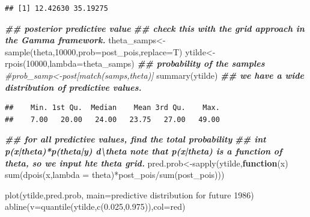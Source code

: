 \documentclass[
]{book}
\newenvironment{Shaded}{\begin{snugshade}}{\end{snugshade}}
\newcommand{\AttributeTok}[1]{\textcolor[rgb]{0.77,0.63,0.00}{#1}}
\newcommand{\CommentTok}[1]{\textcolor[rgb]{0.56,0.35,0.01}{\textit{#1}}}
\newcommand{\ControlFlowTok}[1]{\textcolor[rgb]{0.13,0.29,0.53}{\textbf{#1}}}
\newcommand{\DecValTok}[1]{\textcolor[rgb]{0.00,0.00,0.81}{#1}}
\newcommand{\DocumentationTok}[1]{\textcolor[rgb]{0.56,0.35,0.01}{\textbf{\textit{#1}}}}
\newcommand{\FloatTok}[1]{\textcolor[rgb]{0.00,0.00,0.81}{#1}}
\newcommand{\FunctionTok}[1]{\textcolor[rgb]{0.00,0.00,0.00}{#1}}
\newcommand{\NormalTok}[1]{#1}
\newcommand{\OtherTok}[1]{\textcolor[rgb]{0.56,0.35,0.01}{#1}}
\newcommand{\SpecialCharTok}[1]{\textcolor[rgb]{0.00,0.00,0.00}{#1}}
\newcommand{\StringTok}[1]{\textcolor[rgb]{0.31,0.60,0.02}{#1}}
\theoremstyle{definition}
\theoremstyle{definition}
\theoremstyle{definition}
\theoremstyle{definition}
\theoremstyle{remark}
\begin{document}
\begin{verbatim}
## [1] 12.42630 35.19275
\end{verbatim}

\begin{Shaded}
\begin{Highlighting}[]
\DocumentationTok{\#\# posterior predictive value}
   \DocumentationTok{\#\# check this with the grid approach in the Gamma framework.  }
\NormalTok{  theta\_samps}\OtherTok{\textless{}{-}}\FunctionTok{sample}\NormalTok{(theta,}\DecValTok{10000}\NormalTok{,}\AttributeTok{prob=}\NormalTok{post\_pois,}\AttributeTok{replace=}\NormalTok{T)}
\NormalTok{   ytilde}\OtherTok{\textless{}{-}}\FunctionTok{rpois}\NormalTok{(}\DecValTok{10000}\NormalTok{,}\AttributeTok{lambda=}\NormalTok{theta\_samps) }
 \DocumentationTok{\#\# probability of the samples }
 \CommentTok{\#prob\_samp\textless{}{-}post[match(samps,theta)]}
  \FunctionTok{summary}\NormalTok{(ytilde) }\DocumentationTok{\#\# we have a wide distribution of predictive values.}
\end{Highlighting}
\end{Shaded}

\begin{verbatim}
##    Min. 1st Qu.  Median    Mean 3rd Qu.    Max. 
##    7.00   20.00   24.00   23.75   27.00   49.00
\end{verbatim}

\begin{Shaded}
\begin{Highlighting}[]
\DocumentationTok{\#\# for all predictive values,  find the total probability  }
   \DocumentationTok{\#\# int p(x|theta)*p(theta|y) d\textbackslash{}theta  note that p(x|theta) is a function of theta, so we input hte theta grid.}
\NormalTok{ pred.prob}\OtherTok{\textless{}{-}}\FunctionTok{sapply}\NormalTok{(ytilde,}\ControlFlowTok{function}\NormalTok{(x) }\FunctionTok{sum}\NormalTok{(}\FunctionTok{dpois}\NormalTok{(x,}\AttributeTok{lambda =}\NormalTok{ theta)}\SpecialCharTok{*}\NormalTok{post\_pois}\SpecialCharTok{/}\FunctionTok{sum}\NormalTok{(post\_pois)))  }
  
 \FunctionTok{plot}\NormalTok{(ytilde,pred.prob, }\AttributeTok{main=}\StringTok{\textquotesingle{}predictive distribution for future 1986\textquotesingle{}}\NormalTok{)}
 \FunctionTok{abline}\NormalTok{(}\AttributeTok{v=}\FunctionTok{quantile}\NormalTok{(ytilde,}\FunctionTok{c}\NormalTok{(}\FloatTok{0.025}\NormalTok{,}\FloatTok{0.975}\NormalTok{)),}\AttributeTok{col=}\StringTok{\textquotesingle{}red\textquotesingle{}}\NormalTok{)}
\end{Highlighting}
\end{Shaded}
\end{document}
